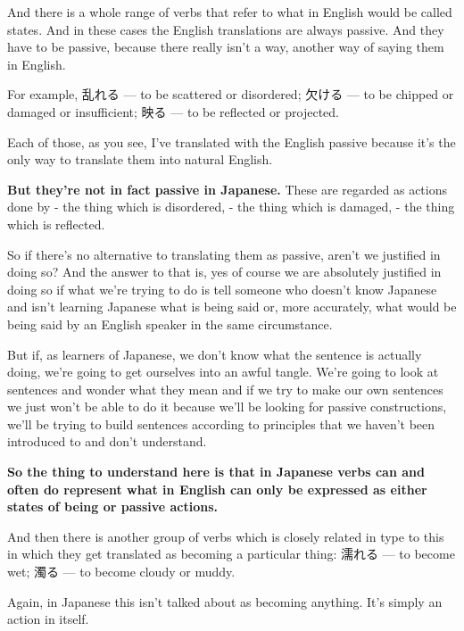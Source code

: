 \thinrule

And there is a whole range of verbs that refer to what in English would be called states. And in these cases the English translations are always passive. And they have to be passive, because there really isn't a way, another way of saying them in English.

For example, 乱れる --- to be scattered or disordered; 欠ける --- to be chipped or damaged or insufficient; 映る --- to be reflected or projected.

{}

Each of those, as you see, I've translated with the English passive because it's the only way to translate them into natural English.

{\bf But they're not in fact passive in Japanese.} These are regarded as actions done by - the thing which is disordered, - the thing which is damaged, - the thing which is reflected.

So if there's no alternative to translating them as passive, aren't we justified in doing so? And the answer to that is, yes of course we are absolutely justified in doing so if what we're trying to do is tell someone who doesn't know Japanese and isn't learning Japanese what is being said or, more accurately, what would be being said by an English speaker in the same circumstance.

But if, as learners of Japanese, we don't know what the sentence is actually doing, we're going to get ourselves into an awful tangle. We're going to look at sentences and wonder what they mean and if we try to make our own sentences we just won't be able to do it because we'll be looking for passive constructions, we'll be trying to build sentences according to principles that we haven't been introduced to and don't understand.

{\bf So the thing to understand here is that in Japanese verbs can and often do represent what in English can only be expressed as either states of being or passive actions.}

\thinrule

And then there is another group of verbs which is closely related in type to this in which they get translated as becoming a particular thing: 濡れる --- to become wet; 濁る --- to become cloudy or muddy.

{}

Again, in Japanese this isn't talked about as becoming anything.\crlf
It's simply an action in itself.

